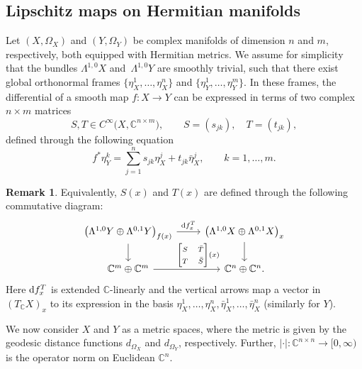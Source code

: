 \documentclass[10pt,a4paper]{amsart}
\numberwithin{equation}{section}
\theoremstyle{definition}
\newtheorem{Remark}[Theorem]{Remark}
\newcommand{\C}{\mathbb{C}} %
\newcommand{\1}{{\bf 1}}
\begin{document}
\subsection{Lipschitz maps on Hermitian manifolds}\label{s_metriccx2}
\sloppy Let $(X,\Omega_X)$ and $(Y,\Omega_Y)$ be complex manifolds of dimension $n$ and $m$, respectively, both equipped with Hermitian metrics.
We assume for simplicity that the bundles $\Lambda^{1,0}X$ and~$\Lambda^{1,0}Y$ are smoothly trivial, such that there exist global orthonormal frames
$\big\{\eta_X^1,\dots,\eta_X^n\big\}$ and $\big\{\eta_Y^1,\dots,\eta_Y^m\big\}$.
In these frames, the differential of a smooth map $f\colon X\rightarrow Y$ can be expressed in terms of two complex $n\times m$ matrices
\begin{equation*}
S,T\in C^\infty\bigl(X,\C^{n\times m}\bigr),\qquad S=(s_{jk}),\quad T=(t_{jk}),
\end{equation*}
defined through the following equation
\begin{equation}\label{defst}
f^* \eta_Y^k = \sum_{j=1}^n s_{jk}\eta_X^j + t_{jk} \bar \eta_X^j,\qquad k=1,\dots, m.
\end{equation}

\begin{Remark}
Equivalently, $S(x)$ and $T(x)$ are defined through the following commutative diagram:
\begin{equation}
\label{commdiagram}
\begin{tikzcd}[ampersand replacement=\&]
\bigl(\Lambda^{1,0}Y\oplus \Lambda^{0,1}Y\bigr)_{f(x)}
\arrow{d} \arrow["{\rm d}f_x^T"]{r} \& \bigl(\Lambda^{1,0}X\oplus \Lambda^{0,1}X\bigr)_{x} \arrow{d}\\
\C^m\oplus \C^m \arrow{r}{\qquad~\begin{bmatrix}
S &\bar T\\
T & \bar S
\end{bmatrix}(x)} \&\C^n\oplus \C^n.
\end{tikzcd}
\end{equation}
Here ${\rm d}f_x^T$ is extended $\C$-linearly and the vertical arrows map a vector in $(T_\C X)_x$ to its expression in the basis $\eta_X^1,\dots, \eta_X^n,\bar \eta_X^1,\dots,\bar \eta_X^n$ (similarly for $Y$).
\end{Remark}

We now consider $X$ and $Y$ as a metric spaces, where the metric is given by the geodesic distance functions $d_{\Omega_X}$ and $d_{\Omega_Y}$, respectively. Further, $|\cdot|\colon \C^{n\times n}\rightarrow [0,\infty)$ is the operator norm on Euclidean $\C^n$.
\end{document}
